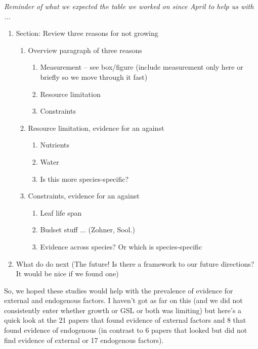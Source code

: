 \documentclass[11pt]{article}
\begin{document}
\emph{Reminder of what we expected the table we worked on since April to help us with ...}
\begin{enumerate}
\item Section: Review three reasons for not growing 
\begin{enumerate} 
\item Overview paragraph of three reasons
\begin{enumerate} 
\item Measurement -- see box/figure  (include measurement only here or briefly so we move through it fast)
\item Resource limitation
\item Constraints
\end{enumerate}
\item Resource limitation, evidence for an against 
\begin{enumerate}
\item Nutrients
\item Water
\item Is this more species-specific?
\end{enumerate}
\item Constraints, evidence for an against 
\begin{enumerate}
\item Leaf life span
\item Budset stuff ... (Zohner, Sool.)
\item Evidence across species? Or which is species-specific
\end{enumerate}
\end{enumerate}
\item What do do next (The future! Is there a framework to our future directions? It would be nice if we found one) 
\end{enumerate}

\vspace{5ex}
So, we hoped these studies would help with the prevalence of evidence for external and endogenous factors. I haven't got as far on this (and we did not consistently enter whether growth or GSL or both was limiting) but here's a quick look at the 21 papers that found evidence of external factors and 8 that found evidence of endogenous (in contrast to 6 papers that looked but did not find evidence of external or 17 endogenous factors).
\end{document}
